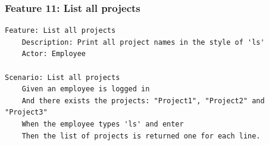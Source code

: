 \subsubsection{Feature 11: List all projects}    %
\begin{lstlisting}
Feature: List all projects
    Description: Print all project names in the style of 'ls'
    Actor: Employee

Scenario: List all projects
    Given an employee is logged in
    And there exists the projects: "Project1", "Project2" and "Project3"
    When the employee types 'ls' and enter
    Then the list of projects is returned one for each line.
\end{lstlisting}


